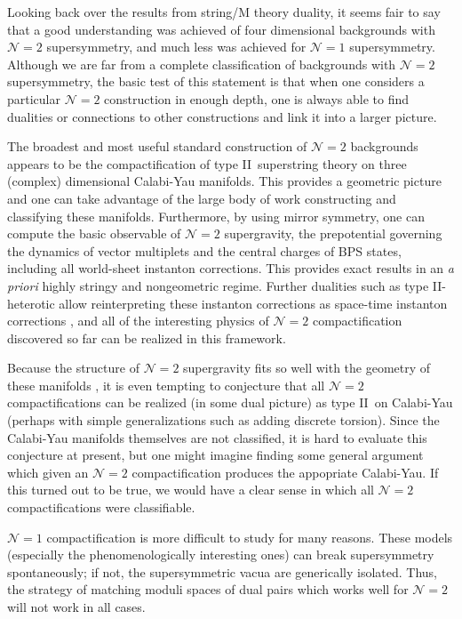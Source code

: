 \documentclass[a4paper,12pt]{amsart}
\numberwithin{equation}{section}
\theoremstyle{plain}
\theoremstyle{definition}
\def\cal{\mathcal}
\def \II {II}
\def\CN{{\cal N}}
\begin{document}
Looking back over the results from string/M theory duality, it seems
fair to say that a good understanding was achieved of four
dimensional backgrounds with $\CN=2$ supersymmetry, and much less
was achieved for $\CN=1$ supersymmetry.  Although we are far from a
complete classification of backgrounds with $\CN=2$ supersymmetry,
the basic test of this statement is that when one considers
a particular $\CN=2$ construction in enough depth, one is always able
to find dualities or connections to other constructions and
link it into a larger picture.

The broadest and most useful standard construction of $\CN=2$
backgrounds appears to be the compactification of type \II\
superstring theory on three (complex) dimensional Calabi-Yau
manifolds.  This provides a geometric picture and one can take
advantage of the large body of work constructing and classifying these
manifolds.  Furthermore, by using mirror symmetry, one can compute the
basic observable of $\CN=2$ supergravity, the prepotential governing
the dynamics of vector multiplets and the central charges of BPS
states, including all world-sheet instanton corrections.  This
provides exact results in an {\it a priori} highly stringy and
nongeometric regime.  Further dualities such as type \II-heterotic
allow reinterpreting these instanton corrections as space-time
instanton corrections \cite{KachruVafa}, and all of the interesting
physics of $\CN=2$ compactification discovered so far can be realized
in this framework.

Because the structure of $\CN=2$ supergravity fits so well with the
geometry of these manifolds \cite{Strominger}, it is even tempting
to conjecture that all $\CN=2$ compactifications can be realized (in
some dual picture) as type \II\ on Calabi-Yau (perhaps with simple
generalizations such as adding discrete torsion).  Since the
Calabi-Yau manifolds themselves are not classified, it is hard to
evaluate this conjecture at present, but one might imagine finding some
general argument which given an $\CN=2$ compactification produces the
appopriate Calabi-Yau.  If this turned out to be true, we would have
a clear sense in which all $\CN=2$ compactifications were classifiable.

$\CN=1$ compactification is more difficult to study for many reasons.
These models (especially the phenomenologically interesting ones) can
break supersymmetry spontaneously; if not, the supersymmetric vacua
are generically isolated.  Thus, the strategy of matching moduli
spaces of dual pairs which works well for $\CN=2$ will not work
in all cases.
\end{document}

